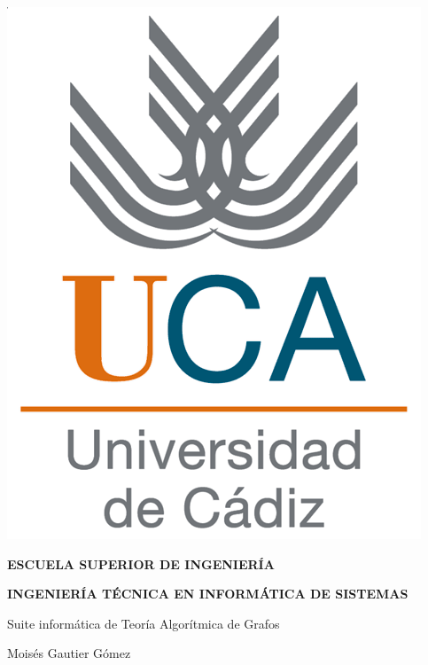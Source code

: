 \pagestyle{empty}
\begin{titlepage}

  \begin{center}

    \includegraphics[scale=0.2]{logo_uca.png} \\

    \vspace{2.0cm}

    \LARGE{\textbf{ESCUELA SUPERIOR DE INGENIERÍA}} \\

    \vspace{1.0cm}

    \Large{\textbf{INGENIERÍA TÉCNICA EN INFORMÁTICA DE SISTEMAS}} \\

    \vspace{3.0cm}

    \Large{Suite informática de Teoría Algorítmica de Grafos} \\

    \vspace{2.0cm}

    \Large{Moisés Gautier Gómez} \\

  \end{center}
\end{titlepage}
